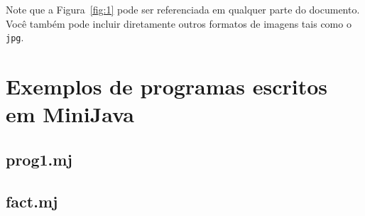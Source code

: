 \documentclass[12pt,a4paper,twoside]{report}
\begin{document}
Note que a Figura~\ref{fig:1} pode ser referenciada em qualquer parte do documento.  Você também pode incluir diretamente outros formatos de imagens tais como o \texttt{jpg}.


\clearpage
{}
\appendix

\chapter{Exemplos de programas escritos em MiniJava \label{ap:Testes}}
\section{prog1.mj}


\section{fact.mj}


\end{document}
